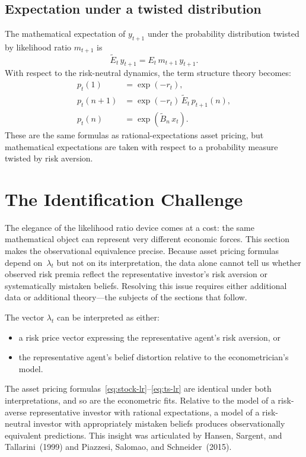 \documentclass[12pt]{article}
\theoremstyle{definition}
\begin{document}
\subsection{Expectation under a twisted distribution}

The mathematical expectation of $y_{t+1}$ under the probability
distribution twisted by likelihood ratio $m_{t+1}$ is
\[
   \tilde E_t\, y_{t+1} = E_t\, m_{t+1}\, y_{t+1}.
\]
With respect to the risk-neutral dynamics, the term structure theory
becomes:
\begin{align*}
p_t(1) &= \exp(-r_t), \\
p_t(n+1) &= \exp(-r_t)\, \tilde E_t\, p_{t+1}(n), \\
p_t(n) &= \exp(\tilde B_n\, x_t).
\end{align*}
These are the same formulas as rational-expectations asset pricing, but
mathematical expectations are taken with respect to a probability
measure {\color{red} twisted by risk aversion}.


\section{The Identification Challenge}
\label{sec:identification}

The elegance of the likelihood ratio device comes at a cost: the same
mathematical object can represent very different economic forces.  This
section makes the observational equivalence precise.  Because asset
pricing formulas depend on~$\lambda_t$ but not on its interpretation,
the data alone cannot tell us whether observed risk premia reflect the
representative investor's risk aversion or systematically mistaken
beliefs.  Resolving this issue requires either additional data
or additional theory---the subjects of the sections that follow.

The vector $\lambda_t$ can be interpreted as either:
\begin{itemize}
\item a risk price vector expressing the representative agent's risk
      aversion, or
\item the representative agent's belief distortion relative to the
      econometrician's model.
\end{itemize}
The asset pricing formulas~\eqref{eq:stock-lr}--\eqref{eq:ts-lr} are
identical under both interpretations, and so are the econometric fits.
Relative to the model of a risk-averse representative investor with
rational expectations, a model of a risk-neutral investor with
appropriately mistaken beliefs produces observationally equivalent
predictions.  This insight was articulated by Hansen, Sargent, and
Tallarini~(1999) and Piazzesi, Salomao, and Schneider~(2015).
\end{document}
